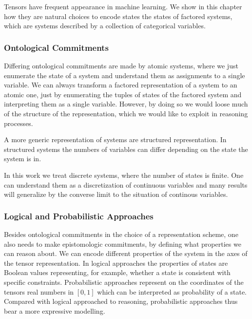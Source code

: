 Tensors have frequent appearance in machine learning.
We show in this chapter how they are natural choices to encode states the states of factored systems, which are systems described by a collection of categorical variables.

\subsubsection{Ontological Commitments}


Differing ontological commitments are made by atomic systems, where we just enumerate the state of a system and understand them as assignments to a single variable.
We can always transform a factored representation of a system to an atomic one, just by enumerating the tuples of states of the factored system and interpreting them as a single variable.
However, by doing so we would loose much of the structure of the representation, which we would like to exploit in reasoning processes.


A more generic representation of systems are structured representation.
In structured systems the numbers of variables can differ depending on the state the system is in.

In this work we treat discrete systems, where the number of states is finite. 
One can understand them as a discretization of continuous variables and many results will generalize by the converse limit to the situation of continous variables.






\subsubsection{Logical and Probabilistic Approaches}

Besides ontological commitments in the choice of a representation scheme, one also needs to make epistomologic commitments, by defining what properties we can reason about.
We can encode different properties of the system in the axes of the tensor representation.
In logical approaches the properties of states are Boolean values representing, for example, whether a state is consistent with specific constraints.
Probabilistic approaches represent on the coordinates of the tensors real numbers in $[0,1]$ which can be interpreted as probability of a state.
Compared with logical approached to reasoning, probabilistic approaches thus bear a more expressive modelling.



